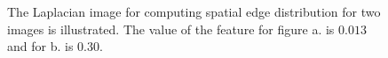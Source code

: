 \documentclass[conference,a4paper]{IEEEtran}
\begin{document}
\begin{figure}
{  }
  \caption{
  The Laplacian image for computing spatial edge distribution for two images is illustrated.  The value of the feature for figure a. is $0.013$ and for b. is $0.30$.
  }
  \label{fig:sed}
\end{figure}
\end{document}
